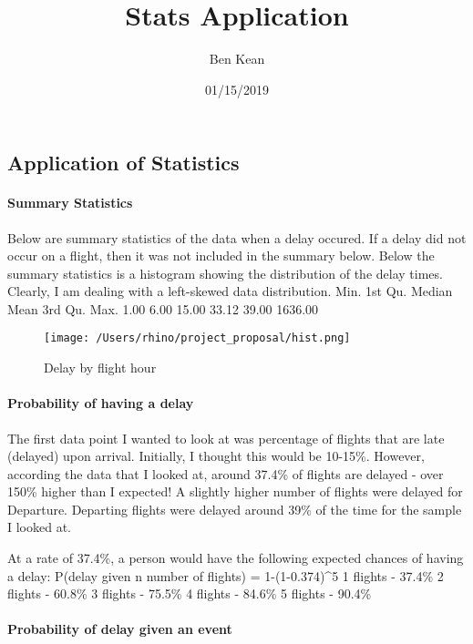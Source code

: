 \documentclass[]{article}
\title{Stats Application}
\author{Ben Kean}
\date{01/15/2019}
\let\oldparagraph\paragraph
\renewcommand{\paragraph}[1]{\oldparagraph{#1}\mbox{}}
\begin{document}
\maketitle

\subsection{Application of Statistics}\label{application-of-statistics}

\paragraph{Summary Statistics}\label{summary-statistics}

Below are summary statistics of the data when a delay occured. If a
delay did not occur on a flight, then it was not included in the summary
below. Below the summary statistics is a histogram showing the
distribution of the delay times. Clearly, I am dealing with a
left-skewed data distribution. Min. 1st Qu. Median Mean 3rd Qu. Max.
1.00 6.00 15.00 33.12 39.00 1636.00

\begin{figure}
\centering
\texttt{[image: /Users/rhino/project\_proposal/hist.png]}
\caption{Delay by flight hour}
\end{figure}

\paragraph{Probability of having a
delay}\label{probability-of-having-a-delay}

The first data point I wanted to look at was percentage of flights that
are late (delayed) upon arrival. Initially, I thought this would be
10-15\%. However, according the data that I looked at, around 37.4\% of
flights are delayed - over 150\% higher than I expected! A slightly
higher number of flights were delayed for Departure. Departing flights
were delayed around 39\% of the time for the sample I looked at.

At a rate of 37.4\%, a person would have the following expected chances
of having a delay: P(delay given n number of flights) = 1-(1-0.374)\^{}5
1 flights - 37.4\% 2 flights - 60.8\% 3 flights - 75.5\% 4 flights -
84.6\% 5 flights - 90.4\%

\paragraph{Probability of delay given an
event}\label{probability-of-delay-given-an-event}
\end{document}
